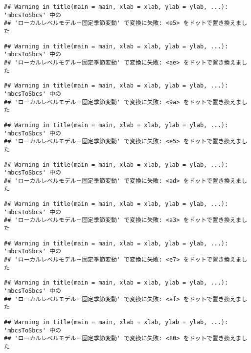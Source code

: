 \documentclass[]{article}
\begin{document}
\begin{verbatim}
## Warning in title(main = main, xlab = xlab, ylab = ylab, ...): 'mbcsToSbcs' 中の
## 'ローカルレベルモデル＋固定季節変動' で変換に失敗: <e5> をドットで置き換えました
\end{verbatim}

\begin{verbatim}
## Warning in title(main = main, xlab = xlab, ylab = ylab, ...): 'mbcsToSbcs' 中の
## 'ローカルレベルモデル＋固定季節変動' で変換に失敗: <ae> をドットで置き換えました
\end{verbatim}

\begin{verbatim}
## Warning in title(main = main, xlab = xlab, ylab = ylab, ...): 'mbcsToSbcs' 中の
## 'ローカルレベルモデル＋固定季節変動' で変換に失敗: <9a> をドットで置き換えました
\end{verbatim}

\begin{verbatim}
## Warning in title(main = main, xlab = xlab, ylab = ylab, ...): 'mbcsToSbcs' 中の
## 'ローカルレベルモデル＋固定季節変動' で変換に失敗: <e5> をドットで置き換えました
\end{verbatim}

\begin{verbatim}
## Warning in title(main = main, xlab = xlab, ylab = ylab, ...): 'mbcsToSbcs' 中の
## 'ローカルレベルモデル＋固定季節変動' で変換に失敗: <ad> をドットで置き換えました
\end{verbatim}

\begin{verbatim}
## Warning in title(main = main, xlab = xlab, ylab = ylab, ...): 'mbcsToSbcs' 中の
## 'ローカルレベルモデル＋固定季節変動' で変換に失敗: <a3> をドットで置き換えました
\end{verbatim}

\begin{verbatim}
## Warning in title(main = main, xlab = xlab, ylab = ylab, ...): 'mbcsToSbcs' 中の
## 'ローカルレベルモデル＋固定季節変動' で変換に失敗: <e7> をドットで置き換えました
\end{verbatim}

\begin{verbatim}
## Warning in title(main = main, xlab = xlab, ylab = ylab, ...): 'mbcsToSbcs' 中の
## 'ローカルレベルモデル＋固定季節変動' で変換に失敗: <af> をドットで置き換えました
\end{verbatim}

\begin{verbatim}
## Warning in title(main = main, xlab = xlab, ylab = ylab, ...): 'mbcsToSbcs' 中の
## 'ローカルレベルモデル＋固定季節変動' で変換に失敗: <80> をドットで置き換えました
\end{verbatim}
\end{document}
